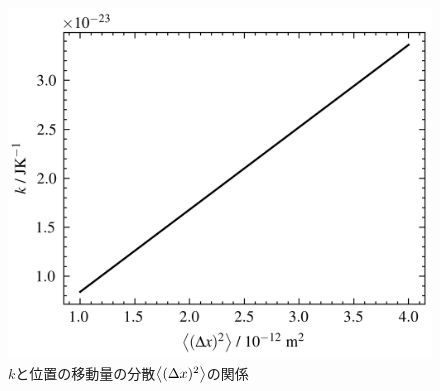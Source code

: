 \begin{figure}
    \centering
    \includegraphics[keepaspectratio, width=0.8\linewidth]{src/figures/k-x-relation/k-x-relation.png}
    \caption{$k$と位置の移動量の分散$\left< (\Delta x)^2 \right>$の関係}\label{fig:k-x-relation}
\end{figure}
